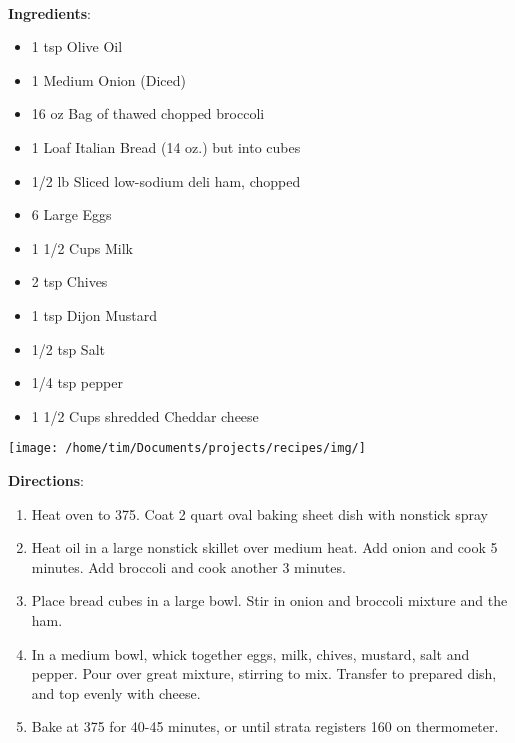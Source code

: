 \documentclass[11pt, twoside, openany]{book}
\begin{document}
 \label{broccoli,-cheddar-and-ham-strata}\hfill\textit{}\\
\begin{minipage}[t]{0.8\linewidth}
\textbf{Ingredients}:\vspace{-3mm}
\begin{multicols}{2}
\begin{itemize}\setlength\itemsep{-1mm}
\item 1 tsp Olive Oil
\item 1 Medium Onion (Diced)
\item 16 oz Bag of thawed chopped broccoli
\item 1 Loaf Italian Bread (14 oz.) but into cubes
\item 1/2 lb Sliced low-sodium deli ham, chopped
\item 6 Large Eggs
\item 1 1/2 Cups Milk
\item 2 tsp Chives
\item 1 tsp Dijon Mustard
\item 1/2 tsp Salt
\item 1/4 tsp pepper
\item 1 1/2 Cups shredded Cheddar cheese
\end{itemize}
\end{multicols}
\end{minipage}
\begin{minipage}[t]{0.2\linewidth}
\centering \strut\vspace*{-\baselineskip}\newline
\texttt{[image: /home/tim/Documents/projects/recipes/img/]}\\
\end{minipage}\vspace{3mm}
\textbf{Directions}:
\vspace{-3mm}\begin{enumerate}\setlength\itemsep{-1mm}
\item Heat oven to 375. Coat 2 quart oval baking sheet dish with nonstick spray
\item Heat oil in a large nonstick skillet over medium heat. Add onion and cook 5 minutes. Add broccoli and cook another 3 minutes.
\item Place bread cubes in a large bowl. Stir in onion and broccoli mixture and the ham. 
\item In a medium bowl, whick together eggs, milk, chives, mustard, salt and pepper. Pour over great mixture, stirring to mix. Transfer to prepared dish, and top evenly with cheese. 
\item Bake at 375 for 40-45 minutes, or until strata registers 160 on thermometer.
\end{enumerate}
\end{document}
